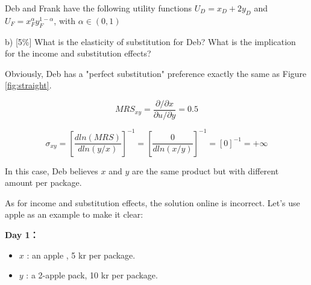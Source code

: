 \documentclass{article}
\begin{document}
Deb and Frank have the following utility functions
$U_D = x_D + 2y_D$ and $U_F = x^\alpha_Fy^{1-\alpha}_F$, with $\alpha \in (0,1)$

b) [5\%] What is the elasticity of substitution for Deb? What is the
implication for the income and substitution effects?

\vspace{2mm}

\begin{mdframed}[backgroundcolor=blue!20,linecolor=white]

Obviously, Deb has a "perfect substitution" preference exactly the same as Figure \ref{fig:straight}.

$$MRS_{xy} = \frac{\partial / \partial x}{\partial u / \partial y} = 0.5$$

$$\sigma_{xy} = [\frac{d ln(MRS)}{d ln(y/x)}]^{-1} = [\frac{0}{d ln(x/y)}]^{-1}=[0]^{-1} = + \infty$$

In this case, Deb believes $x$ and $y$ are the same product but with different amount per package. 

As for income and substitution effects, the solution online is incorrect.
Let's use apple as an example to make it clear:

\vspace{2mm}

\textbf{Day 1：}

\begin{center}
\label{fig:fair}
\end{center}
\vspace{2mm}

\begin{itemize}
\item $x$ : an apple , 5 kr per package.
\item $y$ : a 2-apple pack, 10 kr per package.
\end{itemize}


\end{mdframed}
\end{document}
